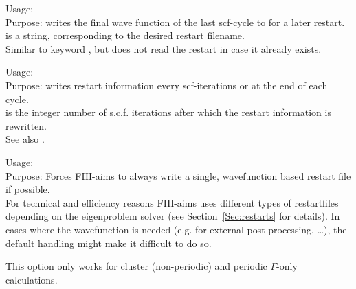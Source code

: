 {
  \noindent
  Usage:   \\[1.0ex]
  Purpose: writes the final wave function of the last scf-cycle to
   for a later restart. \\[1.0ex]
   is a string, corresponding to the desired restart
  filename. \\
}
Similar to keyword , but does not read the restart
   in case it already exists.

{
  \noindent
  Usage:   \\[1.0ex]
  Purpose: writes restart information every 
    scf-iterations or at the end of each cycle. \\[1.0ex]
   is the integer number of s.c.f. iterations after
  which the restart information is rewritten. \\
}
See also .

{
  \noindent
  Usage:   \\[1.0ex]
  Purpose: Forces FHI-aims to always write a single, wavefunction based restart
  file if possible.\\[1.0ex]
}
For technical and efficiency reasons FHI-aims uses different types of
restartfiles depending on the eigenproblem solver (see
Section~\ref{Sec:restarts} for details). In cases where the wavefunction is
needed (e.g. for external post-processing, \ldots), the default 
handling might make it difficult to do so.

This option only works for cluster (non-periodic) and periodic
$\Gamma$-only calculations.

